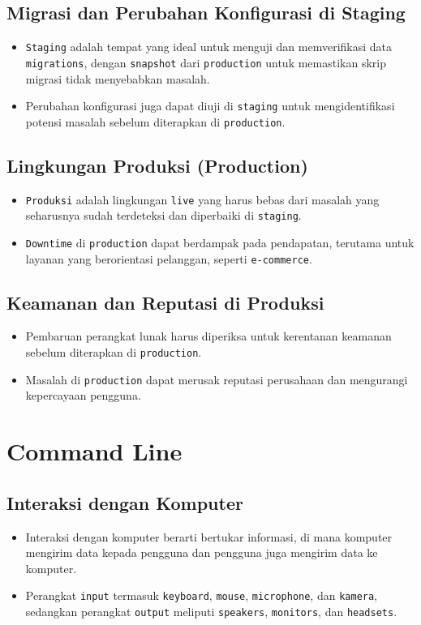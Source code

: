 \documentclass{article}
\begin{document}
\subsection{Migrasi dan Perubahan Konfigurasi di Staging}
\begin{itemize}
    \item \texttt{Staging} adalah tempat yang ideal untuk menguji dan memverifikasi data \texttt{migrations}, dengan \texttt{snapshot} dari \texttt{production} untuk memastikan skrip migrasi tidak menyebabkan masalah.
    \item Perubahan konfigurasi juga dapat diuji di \texttt{staging} untuk mengidentifikasi potensi masalah sebelum diterapkan di \texttt{production}.
\end{itemize}

\subsection{Lingkungan Produksi (Production)}
\begin{itemize}
    \item \texttt{Produksi} adalah lingkungan \texttt{live} yang harus bebas dari masalah yang seharusnya sudah terdeteksi dan diperbaiki di \texttt{staging}.
    \item \texttt{Downtime} di \texttt{production} dapat berdampak pada pendapatan, terutama untuk layanan yang berorientasi pelanggan, seperti \texttt{e-commerce}.
\end{itemize}

\subsection{Keamanan dan Reputasi di Produksi}
\begin{itemize}
    \item Pembaruan perangkat lunak harus diperiksa untuk kerentanan keamanan sebelum diterapkan di \texttt{production}.
    \item Masalah di \texttt{production} dapat merusak reputasi perusahaan dan mengurangi kepercayaan pengguna.
\end{itemize}

\newpage
\section{Command Line}
\subsection{Interaksi dengan Komputer}
\begin{itemize}
    \item Interaksi dengan komputer berarti bertukar informasi, di mana komputer mengirim data kepada pengguna dan pengguna juga mengirim data ke komputer.
    \item Perangkat \texttt{input} termasuk \texttt{keyboard}, \texttt{mouse}, \texttt{microphone}, dan \texttt{kamera}, sedangkan perangkat \texttt{output} meliputi \texttt{speakers}, \texttt{monitors}, dan \texttt{headsets}.
\end{itemize}
\end{document}
